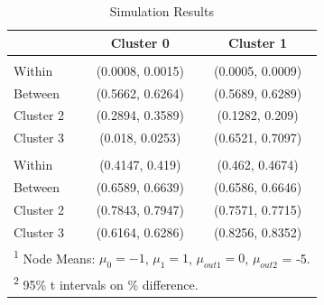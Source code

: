 \documentclass[
  11pt,
  letterpaper,
]{article}
\begin{document}
\begin{longtable}[t]{lcc}
\caption{Simulation Results}\\
\toprule
  & Cluster 0 & Cluster 1\\
\midrule
\addlinespace[0.3em]
\multicolumn{3}{l}{\textbf{Embeddings}}\\
\hspace{1em}Within & (0.0008, 0.0015) & (0.0005, 0.0009)\\
\hspace{1em}Between & (0.5662, 0.6264) & (0.5689, 0.6289)\\
\hspace{1em}Cluster 2 & (0.2894, 0.3589) & (0.1282, 0.209)\\
\hspace{1em}Cluster 3 & (0.018, 0.0253) & (0.6521, 0.7097)\\
\addlinespace[0.3em]
\multicolumn{3}{l}{\textbf{GED}}\\
\hspace{1em}Within & (0.4147, 0.419) & (0.462, 0.4674)\\
\hspace{1em}Between & (0.6589, 0.6639) & (0.6586, 0.6646)\\
\hspace{1em}Cluster 2 & (0.7843, 0.7947) & (0.7571, 0.7715)\\
\hspace{1em}Cluster 3 & (0.6164, 0.6286) & (0.8256, 0.8352)\\
\bottomrule
\multicolumn{3}{l}{\rule{0pt}{1em}\textsuperscript{1} Node Means: $\mu_0 = -1$, $\mu_1 = 1$, $\mu_{out1} = 0$, 
                    $\mu_{out2}$ = -5.}\\
\multicolumn{3}{l}{\rule{0pt}{1em}\textsuperscript{2} 95\% t intervals on \% difference.}\\
\end{longtable}
\end{document}
